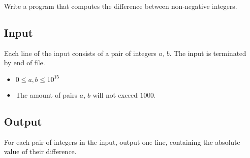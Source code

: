 
Write a program that computes the difference between non-negative integers.

\subsection*{Input}

Each line of the input consists of a pair of integers $a$, $b$.
The input is terminated by end of file.

\begin{itemize}
    \item $0 \leq a, b \leq 10^{15}$
    \item The amount of pairs $a$, $b$ will not exceed $1000$.
\end{itemize}

\subsection*{Output}

For each pair of integers in the input, output one line, containing the absolute value of their difference.
